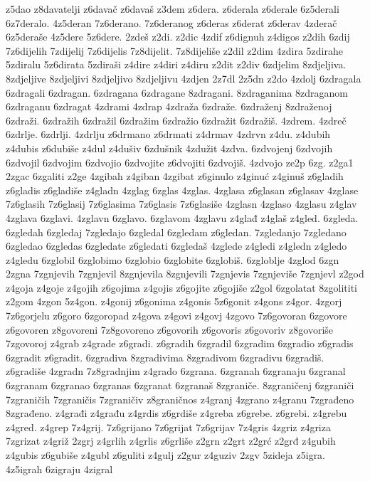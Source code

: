 {z5dao
z8davatelji
z6davač
z6davaš
z3dem
z6dera.
z6derala
z6derale
6z5derali
6z7deralo.
4z5deran
7z6derano.
7z6deranog
z6deras
z6derat
z6derav
4zderač
6z5deraše
4z5dere
5z6dere.
2zdeš
z2di.
z2dic
4zdif
z6dignuh
z4digos
z2dih
6zdij
7z6dijelih
7zdijelij
7z6dijelis
7z8dijelit.
7z8dijeliše
z2dil
z2dim
4zdira
5zdirahe
5zdiralu
5z6dirata
5zdiraši
z4dire
z4diri
z4diru
z2dit
z2div
6zdjelim
8zdjeljiva.
8zdjeljive
8zdjeljivi
8zdjeljivo
8zdjeljivu
4zdjen
2z7dl
2z5dn
z2do
4zdolj
6zdragala
6zdragali
6zdragan.
6zdragana
6zdragane
8zdragani.
8zdraganima
8zdraganom
6zdraganu
6zdragat
4zdrami
4zdrap
4zdraža
6zdraže.
6zdraženj
8zdraženoj
6zdraži.
6zdražih
6zdražil
6zdražim
6zdražio
6zdražit
6zdražiš.
4zdrem.
4zdreč
6zdrlje.
6zdrlji.
4zdrlju
z6drmano
z6drmati
z4drmav
4zdrvn
z4du.
z4dubih
z4dubis
z6dubiše
z4dul
z4dušiv
6zdušnik
4zdužit
4zdva.
6zdvojenj
6zdvojih
6zdvojil
6zdvojim
6zdvojio
6zdvojite
z6dvojiti
6zdvojiš.
4zdvojo
ze2p
6zg.
z2ga1
2zgac
6zgaliti
z2ge
4zgibah
z4giban
4zgibat
z6ginulo
z4ginuć
z4ginuš
z6gladih
z6gladis
z6gladiše
z4gladn
4zglag
6zglas
4zglas.
4zglasa
z6glasan
z6glasav
4zglase
7z6glasih
7z6glasij
7z6glasima
7z6glasis
7z6glasiše
4zglasn
4zglaso
4zglasu
z4glav
4zglava
6zglavi.
4zglavn
6zglavo.
6zglavom
4zglavu
z4glađ
z4glaš
z4gled.
6zgleda.
6zgledah
6zgledaj
7zgledajo
6zgledal
6zgledam
z6gledan.
7zgledanjo
7zgledano
6zgledao
6zgledas
6zgledate
z6gledati
6zgledaš
4zglede
z4gledi
z4gledn
z4gledo
z4gledu
6zglobil
6zglobimo
6zglobio
6zglobite
6zglobiš.
6zgloblje
4zglod
6zgn
2zgna
7zgnjevih
7zgnjevil
8zgnjevila
8zgnjevili
7zgnjevis
7zgnjeviše
7zgnjevl
z2god
z4goja
z4goje
z4gojih
z6gojima
z4gojis
z6gojite
z6gojiše
z2gol
6zgolatat
8zgolititi
z2gom
4zgon
5z4gon.
z4gonij
z6gonima
z4gonis
5z6gonit
z4gons
z4gor.
4zgorj
7z6gorjelu
z6goro
6zgoropad
z4gova
z4govi
z4govj
4zgovo
7z6govoran
6zgovore
z6govoren
z8govoreni
7z8govoreno
z6govorih
z6govoris
z6govoriv
z8govoriše
7zgovoroj
z4grab
z4grade
z6gradi.
z6gradih
6zgradil
6zgradim
6zgradio
z6gradis
6zgradit
z6gradit.
6zgradiva
8zgradivima
8zgradivom
6zgradivu
6zgradiš.
z6gradiše
4zgradn
7z8gradnjim
z4grado
6zgrana.
6zgranah
6zgranaju
6zgranal
6zgranam
6zgranao
6zgranas
6zgranat
6zgranaš
8zgraniče.
8zgraničenj
6zgraniči
7zgraničih
7zgraničis
7zgraničiv
z8graničnos
z4granj
4zgrano
z4granu
7zgrađeno
8zgrađeno.
z4građi
z4građu
z4grdis
z6grdiše
z4greba
z6grebe.
z6grebi.
z4grebu
z4gred.
z4grep
7z4grij.
7z6grijano
7z6grijat
7z6grijav
7z4gris
4zgriz
z4griza
7zgrizat
z4griž
2zgrj
z4grlih
z4grlis
z6grliše
z2grn
z2grt
z2grć
z2grđ
z4gubih
z4gubis
z6gubiše
z4gubl
z6guliti
z4gulj
z2gur
z4guziv
2zgv
5zideja
z5igra.
4z5igrah
6zigraju
4zigral
}
